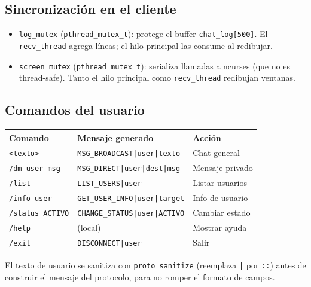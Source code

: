 \documentclass[12pt,a4paper]{article}
\begin{document}
\subsection{Sincronización en el cliente}

\begin{itemize}[nosep]
    \item \texttt{log\_mutex} (\texttt{pthread\_mutex\_t}): protege el buffer
          \texttt{chat\_log[500]}.  El \texttt{recv\_thread} agrega líneas; el
          hilo principal las consume al redibujar.
    \item \texttt{screen\_mutex} (\texttt{pthread\_mutex\_t}): serializa llamadas
          a ncurses (que no es thread-safe).  Tanto el hilo principal como
          \texttt{recv\_thread} redibujan ventanas.
\end{itemize}

\subsection{Comandos del usuario}

\begin{center}
\begin{tabular}{lll}
\toprule
\textbf{Comando} & \textbf{Mensaje generado} & \textbf{Acción} \\
\midrule
\texttt{<texto>}           & \texttt{MSG\_BROADCAST|user|texto}     & Chat general \\
\texttt{/dm user msg}      & \texttt{MSG\_DIRECT|user|dest|msg}     & Mensaje privado \\
\texttt{/list}             & \texttt{LIST\_USERS|user}              & Listar usuarios \\
\texttt{/info user}        & \texttt{GET\_USER\_INFO|user|target}   & Info de usuario \\
\texttt{/status ACTIVO}    & \texttt{CHANGE\_STATUS|user|ACTIVO}    & Cambiar estado \\
\texttt{/help}             & (local)                                & Mostrar ayuda \\
\texttt{/exit}             & \texttt{DISCONNECT|user}               & Salir \\
\bottomrule
\end{tabular}
\end{center}

El texto de usuario se sanitiza con \texttt{proto\_sanitize} (reemplaza \texttt{|}
por \texttt{::}) antes de construir el mensaje del protocolo, para no romper el
formato de campos.
\end{document}
